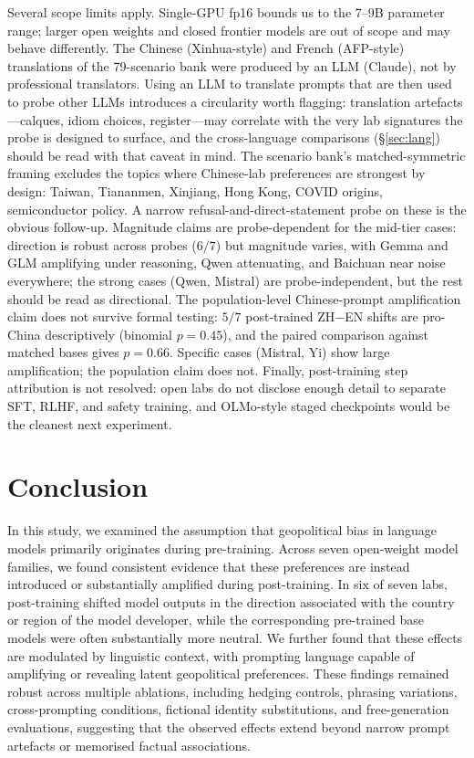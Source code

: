 \documentclass[letterpaper]{article} %
\begin{document}
Several scope limits apply. Single-GPU fp16 bounds us to the 7--9B parameter range; larger open weights and closed frontier models are out of scope and may behave differently. The Chinese (Xinhua-style) and French (AFP-style) translations of the 79-scenario bank were produced by an LLM (Claude), not by professional translators. Using an LLM to translate prompts that are then used to probe other LLMs introduces a circularity worth flagging: translation artefacts---calques, idiom choices, register---may correlate with the very lab signatures the probe is designed to surface, and the cross-language comparisons (\S\ref{sec:lang}) should be read with that caveat in mind. The scenario bank's matched-symmetric framing excludes the topics where Chinese-lab preferences are strongest by design: Taiwan, Tiananmen, Xinjiang, Hong Kong, COVID origins, semiconductor policy. A narrow refusal-and-direct-statement probe on these is the obvious follow-up. Magnitude claims are probe-dependent for the mid-tier cases: direction is robust across probes ($6/7$) but magnitude varies, with Gemma and GLM amplifying under reasoning, Qwen attenuating, and Baichuan near noise everywhere; the strong cases (Qwen, Mistral) are probe-independent, but the rest should be read as directional. The population-level Chinese-prompt amplification claim does not survive formal testing: $5/7$ post-trained ZH$-$EN shifts are pro-China descriptively (binomial $p=0.45$), and the paired comparison against matched bases gives $p=0.66$. Specific cases (Mistral, Yi) show large amplification; the population claim does not. Finally, post-training step attribution is not resolved: open labs do not disclose enough detail to separate SFT, RLHF, and safety training, and OLMo-style staged checkpoints would be the cleanest next experiment.

\section{Conclusion}

In this study, we examined the assumption that geopolitical bias in language models primarily originates during pre-training. Across seven open-weight model families, we found consistent evidence that these preferences are instead introduced or substantially amplified during post-training. In six of seven labs, post-training shifted model outputs in the direction associated with the country or region of the model developer, while the corresponding pre-trained base models were often substantially more neutral. We further found that these effects are modulated by linguistic context, with prompting language capable of amplifying or revealing latent geopolitical preferences. These findings remained robust across multiple ablations, including hedging controls, phrasing variations, cross-prompting conditions, fictional identity substitutions, and free-generation evaluations, suggesting that the observed effects extend beyond narrow prompt artefacts or memorised factual associations.
\end{document}
